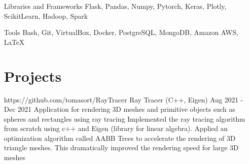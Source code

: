 \documentclass[letterpaper,10pt]{article}
\begin{document}
  \skillItem
    {Libraries and Frameworks}
    {Flask, 
      Pandas, 
      Numpy, 
      Pytorch, 
      Keras, 
      Plotly, 
      ScikitLearn, 
      Hadoop, 
      Spark}

  \skillItem
    {Tools}
    {Bash, 
      Git, 
      VirtualBox, 
      Docker, 
      PostgreSQL, 
      MongoDB, 
      Amazon AWS, 
      \LaTeX\ }
  \vspace{3pt}
\sectionEnd

\section{Projects}
\sectionStart




  \projectHeading
    {https://github.com/tomasort/RayTracer}
    {Ray Tracer}
    {(C++, Eigen)}
    {Aug 2021 - Dec 2021}
    {Application for rendering 3D meshes and primitive objects such as spheres and rectangles using ray tracing}
  \listStart
    \bulletItem
      {Implemented the ray tracing algorithm from scratch using c++ and Eigen (library for linear algebra).}
    \bulletItem
      {Applied an optimization algorithm called AABB Trees to accelerate the rendering of 3D triangle meshes. This dramatically improved the rendering speed for large 3D meshes }
  \listEnd
\end{document}
